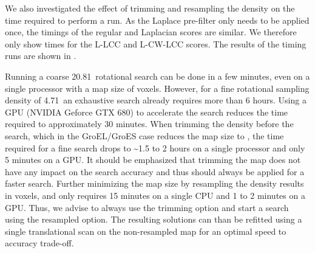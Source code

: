 {}

{}


We also investigated the effect of trimming and resampling the density on the
time required to perform a run. As the Laplace pre-filter only needs to be
applied once, the timings of the regular and Laplacian scores are similar. We
therefore only show times for the L-LCC and L-CW-LCC scores. The results of the
timing runs are shown in .

Running a coarse 20.81\Deg\ rotational search can be done in a few minutes, even on
a single processor with a map size of  voxels.
However, for a fine rotational sampling density of 4.71\Deg\ an exhaustive search
already requires more than 6 hours. Using a GPU (NVIDIA Geforce GTX 680) to
accelerate the search reduces the time required to approximately 30 minutes.
When trimming the density before the search, which in the GroEL/GroES case
reduces the map size to , the time required for a fine
search drops to \textasciitilde1.5 to 2 hours on a single processor and only 5 minutes on a
GPU. It should be emphasized that trimming the map does not have any impact on
the search accuracy and thus should always be applied for a faster search.
Further minimizing the map size by resampling the density results in  voxels, and only requires 15 minutes on a single CPU and 1 to 2
minutes on a GPU. Thus, we advise to always use the trimming option and start a
search using the resampled option. The resulting solutions can than be refitted
using a single translational scan on the non-resampled map for an optimal speed
to accuracy trade-off.

{}

